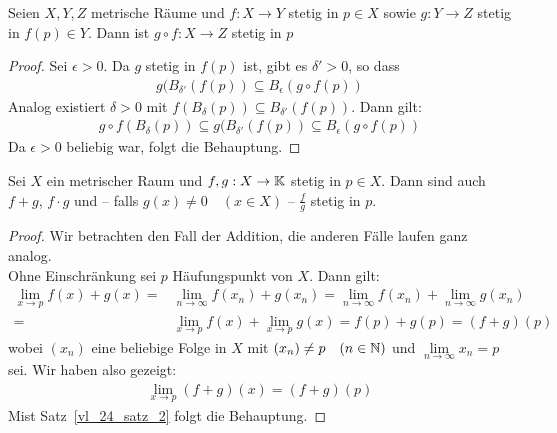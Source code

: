 \begin{Proposition}%
		Seien $X,Y,Z$ metrische Räume und $f: X \rightarrow Y$ stetig in $p \in X$ 
		sowie $g: Y \rightarrow Z$ stetig in $f(p) \in Y$. Dann ist 
		$g \circ f: X \rightarrow Z$ stetig in $p$
\end{Proposition}

\begin{proof}
	Sei $\epsilon >0$. Da $g$ stetig in $f(p)$ ist, gibt es $\delta' > 0$, 
	so dass
	\begin{align*}
		g(B_{\delta'}(f(p)) \subseteq B_\epsilon(g \circ f(p))
	\end{align*}
	Analog existiert $\delta > 0$ mit $f(B_\delta(p)) \subseteq B_{\delta'}
	(f(p))$. Dann gilt:
	\begin{align*}
		g \circ f (B_\delta(p)) \subseteq g(B_{\delta'}(f(p)) 
		\subseteq B_\epsilon(g\circ f(p))
	\end{align*}
	Da $\epsilon > 0$ beliebig war, folgt die Behauptung.
\end{proof}

\begin{Proposition}{\label{vl_24_prop_2}%
	Sei $X$ ein metrischer Raum und $f,g : X \rightarrow \mathbb{K}$ stetig in $p \in X$. 
	Dann sind auch $f + g$, $f \cdot g$  und -- falls $g(x) \neq 0 \quad (x \in X)$ 
	-- $\frac{f}{g}$ stetig in $p$.
}\end{Proposition}

\begin{proof}
	Wir betrachten den Fall der Addition, die anderen Fälle laufen ganz analog. \\
	Ohne Einschränkung sei $p$ Häufungspunkt von $X$. Dann gilt:
	\begin{align*}
		\lim\limits_{x \rightarrow p}{f(x) +g(x)} = & 
		\lim\limits_{n \rightarrow \infty} f(x_n) + g(x_n) = 
		\lim\limits_{n \rightarrow \infty}{f(x_n)} 
		+ \lim\limits_{n \rightarrow \infty} g(x_n) \\ = &
		\lim\limits_{x \rightarrow p}f(x) + \lim\limits_{x \rightarrow p} g(x)
		= f(p) +g(p) = (f+g)(p)
	\end{align*}
	wobei $(x_n)$ eine beliebige Folge in $X$ mit $(x_n) \neq p \quad (n \in \mathbb{N})$
	und $\lim\limits_{n \rightarrow \infty}{x_n} = p$ sei. Wir haben also gezeigt:
	\begin{align*}
		\lim\limits_{x \rightarrow p}{(f+g)(x)} = (f+g)(p)
	\end{align*}	
	Mist Satz~\ref{vl_24_satz_2} folgt die Behauptung. 
\end{proof}

